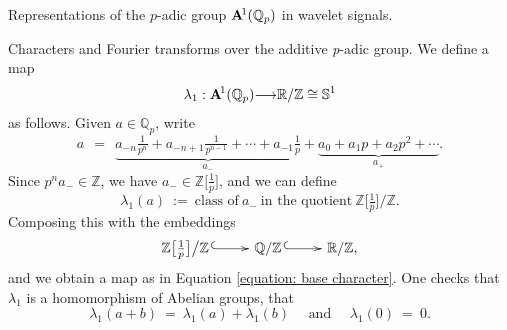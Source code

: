 \documentclass[letterpaper,11pt, reqno]{amsart}
\makeatletter
\newtheorem{monodromy theorem}{Monodromy Theorem}[subsection]
\newtheorem{wild conjecture}[theorem]{Wild Conjecture}
\newtheorem{research objectives}{Research objectives}[subsection]
\newtheorem{research question}[theorem]{Research questions}
\newtheorem{aside question}[theorem]{Aside question}
\newtheorem{audio example}[theorem]{\loudspeaker[3] Example}
\newtheorem{blank remark}[theorem]{}
\newtheorem{terminology and comment}[theorem]{Terminology and comment}
\newtheorem{purity hypothesis}[theorem]{Purity hypothesis}
\newtheorem{corollary of the purity hypothesis}[theorem]{Corollary of the purity hypothesis}
\newcommand{\QQ} {{\mathbb Q}}
\newcommand{\RR} {{\mathbb R}}
\newcommand{\ZZ} {{\mathbb Z}}
\newcommand{\lra}{{\longrightarrow}}
\newcommand{\mono}{\!\xymatrix{{}\ar@{^{(}->}[r]&{}}\!}
\newcommand{\epi}{\!\xymatrix{{}\ar@{->>}[r]&{}}\!}
\numberwithin{equation}{theorem}
\makeatother
\begin{document}
\begin{section}{Representations of the $p$-adic group $\bold{A}^{\!1}(\mathbb{Q}_{p})$ in wavelet signals.}

\begin{subsection}{Characters and Fourier transforms over the additive {\em p}-adic group.}
We define a map
	\begin{equation}\label{equation: base character}
	\lambda_{1}:\bold{A}^{\!1}(\QQ_p)\lra\RR/\ZZ\cong\mathbb{S}^{1}
	\end{equation}
as follows. Given $a\in\QQ_p$, write
	$$
	a
	\ \ =\ \ 
	\underset{a_{-}}{
	\underbrace{a_{-n}\tfrac{1}{p^n}+a_{-n+1}\tfrac{1}{p^{n-1}}+\cdots+a_{-1}\tfrac{1}{p}}}
	+
	\underset{a_{+}}{
	\underbrace{
	a_0+a_1 p+a_2 p^2+\cdots
	}}.
	$$
Since $p^{n}a_{-}\in\ZZ$, we have $a_{-}\in\ZZ\big[\tfrac{1}{p}\big]$, and we can define
	$$
	\lambda_{1}(a)
	\ :=\ 
	\text{class of}\ a_{-}\ \text{in the quotient}\ \ZZ\big[\tfrac{1}{p}\big]\big/\ZZ.
	$$
Composing this with the embeddings
	$$
	\ZZ\big[\tfrac{1}{p}\big]\big/\ZZ
	\mono
	\QQ/\ZZ
	\mono
	\RR/\ZZ,
	$$
and we obtain a map as in Equation \eqref{equation: base character}. One checks that $\lambda_1$ is a homomorphism of Abelian groups, that
	$$
	\lambda_{1}(a+b)
	\ =\ 
	\lambda_{1}(a)+\lambda_{1}(b)
	\ \ \ \ \ \ \text{and}\ \ \ \ \ \ 
	\lambda_{1}(0)
	\ =\ 
	0.
	$$


\end{subsection}
\end{section}
\end{document}
